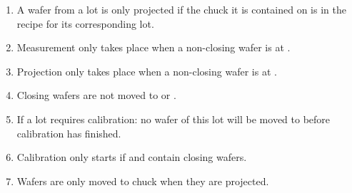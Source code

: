 \begin{enumerate}
    \item A wafer from a lot is only projected if the chuck it is contained on is in the recipe for its corresponding lot.
    \item Measurement only takes place when a non-closing wafer is at \chuckMeas.
    \item Projection only takes place when a non-closing wafer is at \chuckProj.
    \item Closing wafers are not moved to \chuckOut or \tray.
    \item If a lot requires calibration: no wafer of this lot will be moved to \chuckMeas before calibration has finished.
    \item Calibration only starts if \chuckMeas and \chuckProj contain closing wafers.
    \item Wafers are only moved to chuck \chuckOut when they are projected.
\end{enumerate}